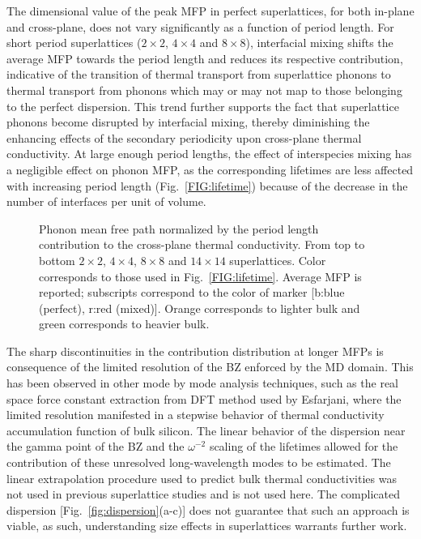 \documentclass[aps,prb,preprint,preprintnumbers,amsmath,amssymb,floatfix,superscriptaddress]{revtex4}
\begin{document}
The dimensional value of the peak MFP in perfect superlattices, for both in-plane and cross-plane, does not vary significantly as a function of period length. For short period superlattices ($2\times2$, $4\times4$ and $8\times8$), interfacial mixing shifts the average MFP towards the period length and reduces its respective contribution, indicative of the transition of thermal transport from superlattice phonons to thermal transport from phonons which may or may not map to those belonging to the perfect dispersion. This trend further supports the fact that superlattice phonons become disrupted by interfacial mixing, thereby diminishing the enhancing effects of the secondary periodicity upon cross-plane thermal conductivity. At large enough period lengths, the effect of interspecies mixing has a negligible effect on phonon MFP, as the corresponding lifetimes are less affected with increasing period length (Fig.~\ref{FIG:lifetime}) because of the decrease in the number of interfaces per unit of volume. \cite{PhysRevB.79.075316}
\begin{figure}%
\begin{center}
\renewcommand{\figure}{Fig.}
\caption{Phonon mean free path normalized by the period length contribution to the cross-plane thermal conductivity. From top to bottom $2\times2$, $4\times4$, $8\times8$ and $14\times14$ superlattices. Color corresponds to those used in Fig.~\ref{FIG:lifetime}. Average MFP is reported; subscripts correspond to the color of marker [b:blue (perfect), r:red (mixed)]. Orange corresponds to lighter bulk and green corresponds to heavier bulk.}
\label{FIG:MFP_cp}
\end{center}
\end{figure}

The sharp discontinuities in the contribution distribution at longer MFPs is consequence of the limited resolution of the BZ enforced by the MD domain. This has been observed in other mode by mode analysis techniques, such as the real space force constant extraction from DFT method used by Esfarjani, where the limited resolution manifested in a stepwise behavior of thermal conductivity accumulation function of bulk silicon. \cite{PhysRevB.84.085204} The linear behavior of the dispersion near the gamma point of the BZ and the $\omega^{-2}$ scaling of the lifetimes allowed for the contribution of these unresolved long-wavelength modes to be estimated. The linear extrapolation procedure used to predict bulk thermal conductivities \cite{PhysRevB.81.214305} was not used in previous superlattice studies \cite{doi:10.1021/nl202186y,Luckyanova16112012} and is not used here. The complicated dispersion [Fig.~\ref{fig:dispersion}(a-c)] does not guarantee that such an approach is viable, as such, understanding size effects in superlattices warrants further work.
\end{document}
